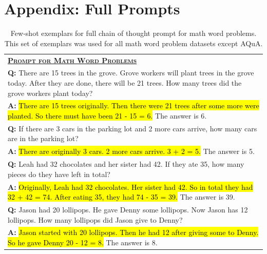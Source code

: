 \documentclass[]{article}
\theoremstyle{plain}
\theoremstyle{definition}
\theoremstyle{remark}
\begin{document}
\clearpage
\section{Appendix: Full Prompts}\label{sec:appendix-full-prompts}
\begingroup
\begin{table}[H]
    \centering
    \small
    \caption{
    Few-shot exemplars for full chain of thought prompt for math word problems. This set of exemplars was used for all math word problem datasets except AQuA. 
    }
    \begin{tabular}{p{\linewidth}}
        \toprule
        \underline{\textbf{\textsc{Prompt for Math Word Problems}}} \\
        \vspace{-2mm}
        \textbf{Q:} There are 15 trees in the grove. Grove workers will plant trees in the grove today. After they are done, there will be 21 trees. How many trees did the grove workers plant today? \\
        \vspace{-1mm}
        \textbf{A:} \hl{There are 15 trees originally. Then there were 21 trees after some more were planted. So there must have been 21 - 15 = 6.} The answer is 6. \\
        \vspace{0mm}
        \textbf{Q:} If there are 3 cars in the parking lot and 2 more cars arrive, how many cars are in the parking lot? \\
        \vspace{-1mm}
        \textbf{A:} \hl{There are originally 3 cars. 2 more cars arrive. 3 + 2 = 5.}  The answer is 5. \\
        \vspace{0mm}
        \textbf{Q:} Leah had 32 chocolates and her sister had 42. If they ate 35, how many pieces do they have left in total? \\
        \vspace{-1mm}
        \textbf{A:} \hl{Originally, Leah had 32 chocolates. Her sister had 42. So in total they had 32 + 42 = 74. After eating 35, they had 74 - 35 = 39.} The answer is 39. \\
        \vspace{0mm}
        \textbf{Q:} Jason had 20 lollipops. He gave Denny some lollipops. Now Jason has 12 lollipops. How many lollipops did Jason give to Denny? \\
        \vspace{-1mm}
        \textbf{A:} \hl{Jason started with 20 lollipops. Then he had 12 after giving some to Denny. So he gave Denny 20 - 12 = 8.} The answer is 8. \\

\end{tabular}
\end{table}
\end{document}
